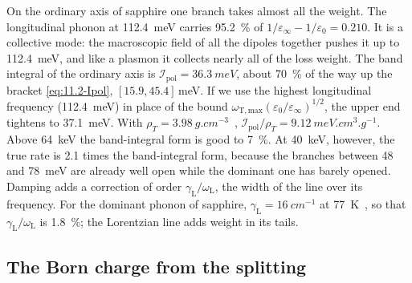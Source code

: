 On the ordinary axis of sapphire one branch takes almost all the weight. The longitudinal phonon at \SI{112.4}{meV} carries \SI{95.2}{\percent} of $1/\varepsilon_\infty - 1/\varepsilon_0 = 0.210$. It is a collective mode: the macroscopic field of all the dipoles together pushes it up to \SI{112.4}{meV}, and like a plasmon it collects nearly all of the loss weight. The band integral of the ordinary axis is $\mathcal{I}_{\mathrm{pol}} = \SI{36.3}{meV}$, about \SI{70}{\percent} of the way up the bracket \cref{eq:11.2-Ipol}, $[15.9, 45.4]$\,meV. If we use the highest longitudinal frequency (\SI{112.4}{meV}) in place of the bound $\omega_{\mathrm{T,max}}(\varepsilon_0/\varepsilon_\infty)^{1/2}$, the upper end tightens to \SI{37.1}{meV}. With $\rho_T = \SI{3.98}{g.cm^{-3}}$~\cite[Table~I]{griffin2018directional}, $\mathcal{I}_{\mathrm{pol}}/\rho_T = \SI{9.12}{meV.cm^3.g^{-1}}$. Above \SI{64}{keV} the band-integral form is good to \SI{7}{\percent}. At \SI{40}{keV}, however, the true rate is 2.1 times the band-integral form, because the branches between 48 and \SI{78}{meV} are already well open while the dominant one has barely opened. Damping adds a correction of order $\gamma_{\mathrm{L}}/\omega_{\mathrm{L}}$, the width of the line over its frequency. For the dominant phonon of sapphire, $\gamma_{\mathrm{L}} = \SI{16}{cm^{-1}}$ at \SI{77}{K}~\cite[Table~II]{griffin2018directional}, so that $\gamma_{\mathrm{L}}/\omega_{\mathrm{L}}$ is \SI{1.8}{\percent}; the Lorentzian line adds weight in its tails.

\subsection{The Born charge from the splitting}\label{sec:11.2-split}

